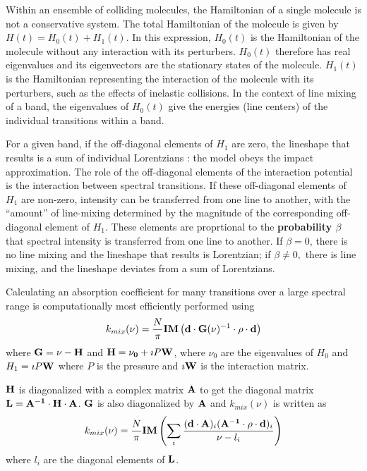 \documentclass[11pt]{article}
\begin{document}
Within an ensemble of colliding molecules, the Hamiltonian of a single 
molecule is not a conservative system.  The total Hamiltonian 
of the molecule is given by $H(t)=H_{0}(t)+ H_{1}(t)$.  In this
expression, $H_{0}(t)$ is the Hamiltonian of the molecule without any
interaction with its perturbers.  $H_{0}(t)$ therefore has real eigenvalues
and its eigenvectors are the stationary states of the molecule.  
$H_{1}(t)$ is the Hamiltonian representing the interaction of the molecule
with its perturbers, such as the effects of inelastic collisions.  
In the context of line mixing of a band, the eigenvalues of $H_{0}(t)$ give
the energies (line centers) of the individual transitions within a band.

For a given band, if the off-diagonal elements of $H_{1}$ are zero, the 
lineshape that results is a sum of individual Lorentzians : the model obeys 
the impact approximation.  The role of the off-diagonal elements of the 
interaction potential is the interaction between spectral 
transitions. If these off-diagonal elements of  $H_{1}$ are non-zero, 
intensity can be transferred from one line to another, 
with the ``amount'' of line-mixing determined by the magnitude of the 
corresponding off-diagonal element of $H_{1}$.  These elements are
proprtional to the {\bf probability $\beta$} that spectral intensity is 
transferred from one line to another. If $\beta = 0$, there is no line 
mixing and the lineshape that results is Lorentzian; if $\beta \ne 0,$ 
there is line mixing, and the lineshape deviates from a sum of Lorentzians.

Calculating an absorption coefficient for many transitions over a
large spectral range is computationally most efficiently performed using 
\[
k_{mix}(\nu)=\frac{N}{\pi} {\bf IM} \left({\bf d}\cdot{\bf G}({
\bf
  \nu})^{-1} \cdot{\bf \rho}\cdot{\bf d}\right)
\]
where ${\bf G}={\bf \nu}-{\bf H}$ and 
${\bf H}={\bf \nu_{0}}+\imath P{\bf W}$, where $\nu_{0}$ are the 
eigenvalues of $H_{0}$ and $H_{1} = \imath P{\bf W}$ where $P$ is the 
pressure and $\imath {\bf W}$ is the interaction matrix. 
 
${\bf H}$ is diagonalized with a complex matrix ${\bf A}$ to get the 
diagonal matrix ${\bf L}={\bf A^{-1}}\cdot{\bf H}\cdot{\bf A}$.
${\bf G}$ is also diagonalized by ${\bf A}$ and $k_{mix}(\nu)$ is written
as
\[
k_{mix}(\nu)=\frac{N}{\pi} {\bf IM} \left(\sum_{i}\frac{({\bf d
\cdot
    A})_{i} ({\bf A^{-1}\cdot\rho\cdot d})_{i}}{\nu - l_{i}}\right)
\]
where $l_{i}$ are the diagonal elements of ${\bf L}$.  
\end{document}
